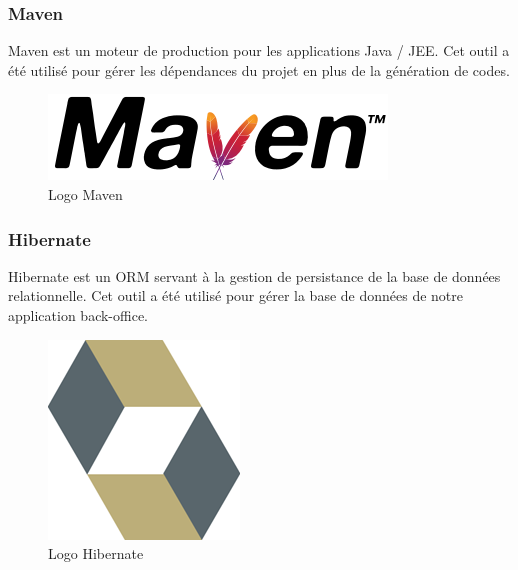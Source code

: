 \subsubsection{Maven}
\noindent\begin{minipage}{0.69\textwidth}
Maven est un moteur de production pour les applications Java / JEE. Cet outil a été utilisé pour gérer les dépendances du projet en plus de la génération de codes.
\end{minipage}
\begin{minipage}{0.3\textwidth}
\begin{figure}[H]
  \centering
  \includegraphics[scale=0.4]{figures/logo/maven.png}
  \caption{Logo Maven}
  \label{code39}
\end{figure}
\end{minipage}
\subsubsection{Hibernate}
\noindent\begin{minipage}{0.69\textwidth}
Hibernate est un ORM \footnotemark servant à la gestion de persistance de la base de données relationnelle. Cet outil a été utilisé pour gérer la base de données de notre application back-office.
\end{minipage}
\begin{minipage}{0.3\textwidth}
\begin{figure}[H]
  \centering
  \includegraphics[scale=0.35]{figures/logo/hibernate.png}
  \caption{Logo Hibernate}
  \label{code40}
\end{figure}
\end{minipage}
